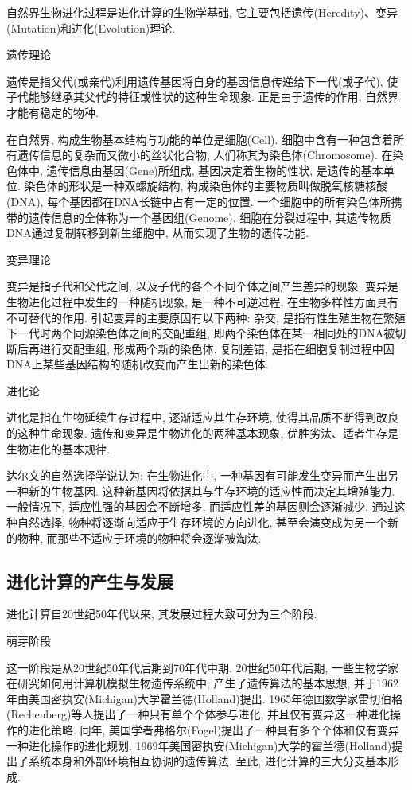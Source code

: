 {  自然界生物进化过程是进化计算的生物学基础, 它主要包括遗传(Heredity)、变异(Mutation)和进化(Evolution)理论.

   遗传理论

  遗传是指父代(或亲代)利用遗传基因将自身的基因信息传递给下一代(或子代), 使子代能够继承其父代的特征或性状的这种生命现象. 正是由于遗传的作用, 自然界才能有稳定的物种.

  在自然界, 构成生物基本结构与功能的单位是细胞(Cell). 细胞中含有一种包含着所有遗传信息的复杂而又微小的丝状化合物, 人们称其为染色体(Chromosome).
  在染色体中, 遗传信息由基因(Gene)所组成, 基因决定着生物的性状, 是遗传的基本单位.
   染色体的形状是一种双螺旋结构, 构成染色体的主要物质叫做脱氧核糖核酸(DNA), 每个基因都在DNA长链中占有一定的位置.
   一个细胞中的所有染色体所携带的遗传信息的全体称为一个基因组(Genome).
   细胞在分裂过程中, 其遗传物质DNA通过复制转移到新生细胞中, 从而实现了生物的遗传功能.

    变异理论

   变异是指子代和父代之间, 以及子代的各个不同个体之间产生差异的现象. 变异是生物进化过程中发生的一种随机现象, 是一种不可逆过程, 在生物多样性方面具有不可替代的作用. 引起变异的主要原因有以下两种:
   杂交, 是指有性生殖生物在繁殖下一代时两个同源染色体之间的交配重组, 即两个染色体在某一相同处的DNA被切断后再进行交配重组, 形成两个新的染色体. 复制差错, 是指在细胞复制过程中因DNA上某些基因结构的随机改变而产生出新的染色体.

      进化论

    进化是指在生物延续生存过程中, 逐渐适应其生存环境, 使得其品质不断得到改良的这种生命现象. 遗传和变异是生物进化的两种基本现象, 优胜劣汰、适者生存是生物进化的基本规律.

    达尔文的自然选择学说认为: 在生物进化中, 一种基因有可能发生变异而产生出另一种新的生物基因. 这种新基因将依据其与生存环境的适应性而决定其增殖能力. 一般情况下, 适应性强的基因会不断增多, 而适应性差的基因则会逐渐减少. 通过这种自然选择, 物种将逐渐向适应于生存环境的方向进化, 甚至会演变成为另一个新的物种, 而那些不适应于环境的物种将会逐渐被淘汰.
\subsection{进化计算的产生与发展}
 进化计算自20世纪50年代以来, 其发展过程大致可分为三个阶段.

       萌芽阶段

     这一阶段是从20世纪50年代后期到70年代中期. 20世纪50年代后期, 一些生物学家在研究如何用计算机模拟生物遗传系统中, 产生了遗传算法的基本思想, 并于1962年由美国密执安(Michigan)大学霍兰德(Holland)提出. 1965年德国数学家雷切伯格(Rechenberg)等人提出了一种只有单个个体参与进化, 并且仅有变异这一种进化操作的进化策略. 同年, 美国学者弗格尔(Fogel)提出了一种具有多个个体和仅有变异一种进化操作的进化规划. 1969年美国密执安(Michigan)大学的霍兰德(Holland)提出了系统本身和外部环境相互协调的遗传算法. 至此, 进化计算的三大分支基本形成.

}
